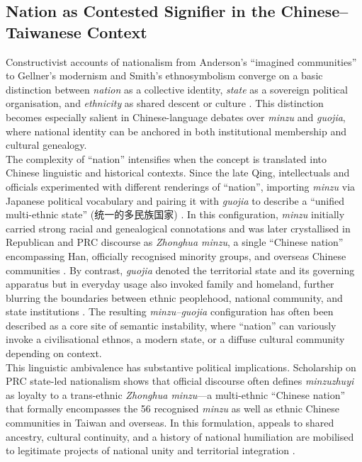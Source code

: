\documentclass[man,12pt]{apa7}
\begin{document}
\subsection{Nation as Contested Signifier in the Chinese–Taiwanese Context}

Constructivist accounts of nationalism from Anderson's ``imagined communities'' to Gellner's modernism and Smith's ethnosymbolism converge on a basic distinction between \emph{nation} as a collective identity, 
\emph{state} as a sovereign political organisation, and \emph{ethnicity} as shared descent or culture \parencite{anderson1991,gellner1983,smith1986,calhoun1997}. 
This distinction becomes especially salient in Chinese-language debates over \emph{minzu} and \emph{guojia}, where national identity can be anchored in both institutional membership and cultural genealogy.\\%
The complexity of ``nation'' intensifies when the concept is translated into Chinese linguistic and historical contexts. 
Since the late Qing, intellectuals and officials experimented with different renderings of ``nation'', importing \emph{minzu} via Japanese political vocabulary and pairing it with \emph{guojia} to describe a ``unified multi-ethnic state'' (统一的多民族国家) \parencite{zhao2000}. 
In this configuration, \emph{minzu} initially carried strong racial and genealogical connotations and was later crystallised in Republican and PRC discourse as \emph{Zhonghua minzu}, 
a single ``Chinese nation'' encompassing Han, officially recognised minority groups, and overseas Chinese communities \parencite{carlson2016}. 
By contrast, \emph{guojia} denoted the territorial state and its governing apparatus but in everyday usage also invoked family and homeland, 
further blurring the boundaries between ethnic peoplehood, national community, and state institutions \parencite{wang2024}. 
The resulting \emph{minzu–guojia} configuration has often been described as a core site of semantic instability, where ``nation'' can variously invoke a civilisational ethnos, a modern state, or a diffuse cultural community depending on context.\\%
This linguistic ambivalence has substantive political implications. 
Scholarship on PRC state-led nationalism shows that official discourse often defines \emph{minzuzhuyi} as loyalty to a trans-ethnic \emph{Zhonghua minzu}—a multi-ethnic ``Chinese nation'' that formally encompasses the 56 recognised \emph{minzu} 
as well as ethnic Chinese communities in Taiwan and overseas. 
In this formulation, appeals to shared ancestry, cultural continuity, and a history of national humiliation are mobilised to legitimate projects of national unity and territorial integration \parencite{carlson2016,cao2021}. 
\end{document}
